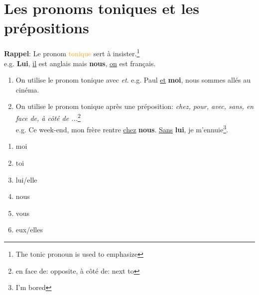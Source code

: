 \documentclass[math,code]{amznotes}
\theoremstyle{remark}
\begin{document}
\section{Les pronoms toniques et les prépositions}
\textbf{Rappel}: Le pronom \textcolor{orange}{tonique} sert à insister.\footnote{The tonic pronoun is used to emphasize} \\
e.g. \textbf{Lui}, \underline{il} est anglais mais \textbf{nous}, \underline{on} est français.
\begin{enumerate}
    \item On utilise le pronom tonique avec \textit{et}. \newline
    e.g. Paul \underline{et} \textbf{moi}, nous sommes allés au cinéma.
    \item On utilise le pronom tonique après une préposition: \textit{chez, pour, avec, sans, en face de, à côté de ...}\footnote{en face de: opposite, à côté de: next to} \\
    e.g. Ce week-end, mon frère rentre \underline{chez} \textbf{nous}. \underline{Sans} \textbf{lui}, je m'ennuie\footnote{I'm bored}.
\end{enumerate}
\begin{notebox}
    \begin{enumerate}
        \item moi
        \item toi
        \item lui/elle
        \item nous
        \item vous
        \item eux/elles
    \end{enumerate}
\end{notebox}
\end{document}
